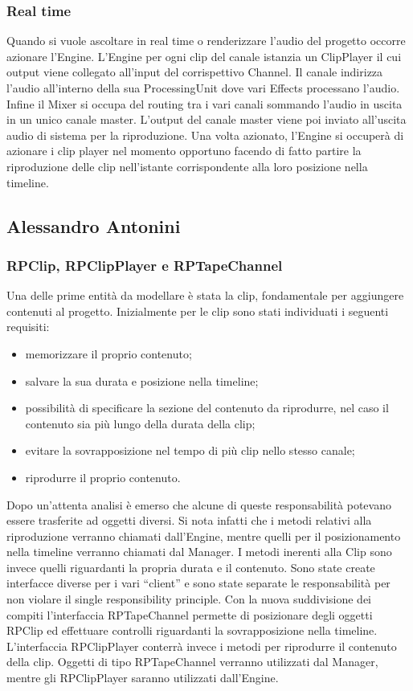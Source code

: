 \documentclass[a4paper,12pt]{report}
\begin{document}
\subsubsection{Real time}
Quando si vuole ascoltare in real time o renderizzare l’audio del progetto occorre azionare l’Engine. 
L’Engine per ogni clip del canale istanzia un ClipPlayer il cui output viene collegato all’input del corrispettivo Channel. Il canale indirizza l’audio all’interno della sua ProcessingUnit dove vari Effects processano l’audio. Infine il Mixer si occupa del routing tra i vari canali sommando l’audio in uscita in un unico canale master. L’output del canale master viene poi inviato all’uscita audio di sistema per la riproduzione.
Una volta azionato, l’Engine si occuperà di azionare i clip player nel momento opportuno facendo di fatto partire la riproduzione delle clip nell’istante corrispondente alla loro posizione nella timeline.

\subsection{Alessandro Antonini}

\subsubsection{RPClip, RPClipPlayer e RPTapeChannel}
Una delle prime entità da modellare è stata la clip, fondamentale per aggiungere contenuti al progetto.
Inizialmente per le clip sono stati individuati i seguenti requisiti: 
\begin{itemize}
    \item memorizzare il proprio contenuto;
    \item salvare la sua durata e posizione nella timeline;
    \item possibilità di specificare la sezione del contenuto da riprodurre, nel caso il contenuto sia più lungo della durata della clip;
    \item evitare la sovrapposizione nel tempo di più clip nello stesso canale;
    \item riprodurre il proprio contenuto.
\end{itemize}

Dopo un’attenta analisi è emerso che alcune di queste responsabilità potevano essere trasferite ad oggetti diversi. 
Si nota infatti che i metodi relativi alla riproduzione verranno chiamati dall’Engine, mentre quelli per il posizionamento nella timeline verranno chiamati dal Manager.
I metodi inerenti alla Clip sono invece quelli riguardanti la propria durata e il contenuto.
Sono state create interfacce diverse per i vari “client” e sono state separate le responsabilità per non violare il single responsibility principle.
Con la nuova suddivisione dei compiti l’interfaccia RPTapeChannel permette di posizionare degli oggetti RPClip ed effettuare controlli riguardanti la sovrapposizione nella timeline.
L’interfaccia RPClipPlayer conterrà invece i metodi per riprodurre il contenuto della clip.
Oggetti di tipo RPTapeChannel verranno utilizzati dal Manager, mentre gli RPClipPlayer saranno utilizzati dall’Engine.
\end{document}
